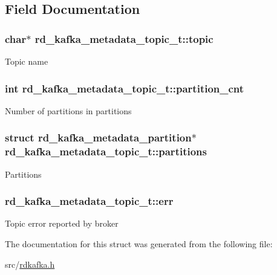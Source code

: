 \subsection{Field Documentation}
\hypertarget{structrd__kafka__metadata__topic__t_a4155a2c939e93b0292398d2590201718}{
\subsubsection[{topic}]{\setlength{\rightskip}{0pt plus 5cm}char$\ast$ {\bf rd\_\-kafka\_\-metadata\_\-topic\_\-t::topic}}}
\label{structrd__kafka__metadata__topic__t_a4155a2c939e93b0292398d2590201718}
Topic name \hypertarget{structrd__kafka__metadata__topic__t_aaee48d1e35102c49858e46a3a5f6d043}{
\subsubsection[{partition\_\-cnt}]{\setlength{\rightskip}{0pt plus 5cm}int {\bf rd\_\-kafka\_\-metadata\_\-topic\_\-t::partition\_\-cnt}}}
\label{structrd__kafka__metadata__topic__t_aaee48d1e35102c49858e46a3a5f6d043}
Number of partitions in {\ttfamily partitions} \hypertarget{structrd__kafka__metadata__topic__t_a62c2ba710cde485ba7157e69bc902a17}{
\subsubsection[{partitions}]{\setlength{\rightskip}{0pt plus 5cm}struct rd\_\-kafka\_\-metadata\_\-partition$\ast$ {\bf rd\_\-kafka\_\-metadata\_\-topic\_\-t::partitions}}}
\label{structrd__kafka__metadata__topic__t_a62c2ba710cde485ba7157e69bc902a17}
Partitions \hypertarget{structrd__kafka__metadata__topic__t_aa178078dba633d6bb1b0e2844addda2a}{
\subsubsection[{err}]{ {\bf rd\_\-kafka\_\-metadata\_\-topic\_\-t::err}}}
\label{structrd__kafka__metadata__topic__t_aa178078dba633d6bb1b0e2844addda2a}
Topic error reported by broker 

The documentation for this struct was generated from the following file:\begin{DoxyCompactItemize}
\item 
src/\hyperlink{rdkafka_8h}{rdkafka.h}\end{DoxyCompactItemize}
